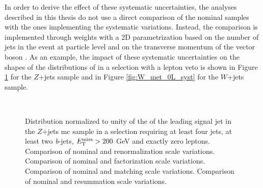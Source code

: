 In order to derive the effect of these systematic uncertainties, the analyses described in this thesis do not use a direct comparison of the nominal 
samples with the ones implementing the systematic variations.
Instead, the comparison is implemented through weights with a 2D parametrization based on the number of jets in the event at particle level 
and on the transverse momentum of the vector boson \cite{Anders:2291836}.
As an example, the impact of these systematic uncertainties on the shapes of the distributions of \met in a selection with a lepton veto is shown in Figure \ref{fig:Z_met_0L_syst} for the $Z$+jets sample and in Figure \ref{fig:W_met_0L_syst} for the $W$+jets sample.  

\begin{figure}[h!]
\centering 
{}
\\
\caption{Distribution normalized to unity of the \pt of the leading signal jet in the $Z$+jets \gls{mc} sample in a selection requiring at least four jets, at least two \textit{b}-jets, $E_{\rm T}^{\mathrm{miss}}>200$ GeV and exactly zero leptons. 
 Comparison of nominal and renormalization scale variations.
 Comparison of nominal and factorization scale variations.
 Comparison of nominal and matching scale variations.
 Comparison of nominal and resummation scale variations.
}\label{fig:Z_met_0L_syst}
\end{figure}


